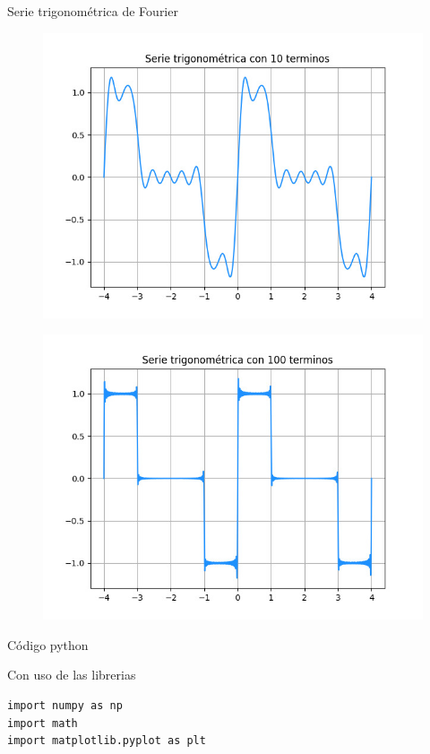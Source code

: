 \documentclass[
	12pt, %
]{fphw}
\begin{document}
\newpage
{\color{teal}
\dotfill
Serie trigonométrica de Fourier
\dotfill}

\begin{figure}[H]
  \centering
  \includegraphics[scale=0.8]{images/funcion3_10.jpg}
\end{figure}

\begin{figure}[H]
  \centering
  \includegraphics[scale=0.8]{images/funcion3.jpg}
\end{figure}

\newpage
{\color{teal}
\dotfill
Código python
\dotfill}

Con uso de las librerias
\begin{verbatim}
import numpy as np
import math
import matplotlib.pyplot as plt
\end{verbatim}
\end{document}
